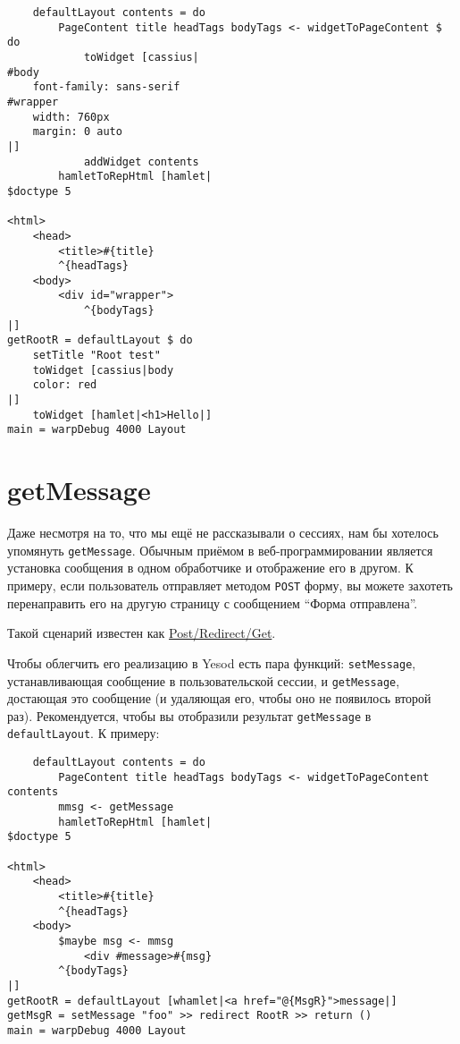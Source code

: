 \begin{lstlisting}
    defaultLayout contents = do
        PageContent title headTags bodyTags <- widgetToPageContent $ do
            toWidget [cassius|
#body
    font-family: sans-serif
#wrapper
    width: 760px
    margin: 0 auto
|]
            addWidget contents
        hamletToRepHtml [hamlet|
$doctype 5

<html>
    <head>
        <title>#{title}
        ^{headTags}
    <body>
        <div id="wrapper">
            ^{bodyTags}
|]
getRootR = defaultLayout $ do
    setTitle "Root test"
    toWidget [cassius|body
    color: red
|]
    toWidget [hamlet|<h1>Hello|]
main = warpDebug 4000 Layout
\end{lstlisting}%

\section {getMessage}

Даже несмотря на то, что мы ещё не рассказывали о сессиях, нам бы хотелось упомянуть \lstinline!getMessage!. Обычным приёмом в веб-программировании является установка сообщения в одном обработчике и отображение его в другом. К примеру, если пользователь отправляет методом \lstinline!POST! форму, вы можете захотеть перенаправить его на другую страницу с сообщением ``Форма отправлена''.

\begin{remark}
Такой сценарий известен как \href{http://en.wikipedia.org/wiki/Post/Redirect/Get}{Post/Redirect/Get}\footnotemark[\value{footnote}].
\end{remark}


Чтобы облегчить его реализацию в Yesod  есть пара функций: \lstinline!setMessage!, устанавливающая сообщение в пользовательской сессии, и \lstinline!getMessage!, достающая это сообщение (и удаляющая его, чтобы оно не появилось второй раз). Рекомендуется, чтобы вы отобразили результат \lstinline!getMessage! в \lstinline!defaultLayout!. К примеру:

\begin{lstlisting}
    defaultLayout contents = do
        PageContent title headTags bodyTags <- widgetToPageContent contents
        mmsg <- getMessage
        hamletToRepHtml [hamlet|
$doctype 5

<html>
    <head>
        <title>#{title}
        ^{headTags}
    <body>
        $maybe msg <- mmsg
            <div #message>#{msg}
        ^{bodyTags}
|]
getRootR = defaultLayout [whamlet|<a href="@{MsgR}">message|]
getMsgR = setMessage "foo" >> redirect RootR >> return ()
main = warpDebug 4000 Layout
\end{lstlisting}%


